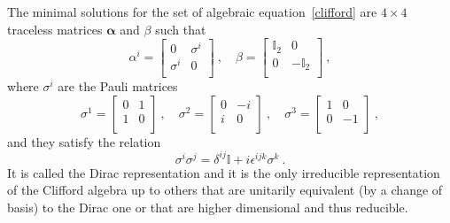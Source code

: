    The minimal solutions for the set of algebraic equation~\eqref{clifford} are $4 \times 4$ traceless matrices $\boldsymbol \alpha$ and $\beta$ such that
    \begin{equation*}
        \alpha^i = \begin{bmatrix}
            0 & \sigma^i \\ 
            \sigma^i & 0 \\
        \end{bmatrix} ~, \quad \beta = 
        \begin{bmatrix}
            \mathbb I_2 & 0 \\
            0 & - \mathbb I_2 \\
        \end{bmatrix} ~, 
    \end{equation*}
    where $\sigma^i$ are the Pauli matrices 
    \begin{equation*}
        \sigma^1 = \begin{bmatrix} 0 & 1 \\ 1 & 0 \\ \end{bmatrix} ~,
        \quad \sigma^2 = \begin{bmatrix} 0 & -i \\ i & 0 \\ \end{bmatrix} ~,
        \quad \sigma^3 = \begin{bmatrix} 1 & 0 \\ 0 & -1 \\ \end{bmatrix} ~,
    \end{equation*}
    and they satisfy the relation 
    \begin{equation} \label{sigma}
        \sigma^i \sigma^j = \delta^{ij} \mathbb I + i \epsilon^{ijk} \sigma^k ~.
    \end{equation}
    It is called the Dirac representation and it is the only irreducible representation of the Clifford algebra up to others that are unitarily equivalent (by a change of basis) to the Dirac one or that are higher dimensional and thus reducible.

